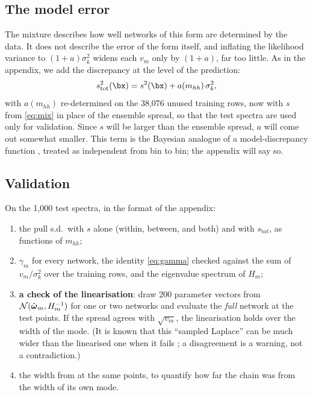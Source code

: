 \subsection{The model error}

The mixture describes how well networks of this form are determined by the data. It does not
describe the error of the form itself, and inflating the likelihood variance to
$(1+a)\sigma_k^2$ widens each $v_m$ only by $(1+a)$, far too little. As in the appendix, we
add the discrepancy at the level of the prediction:
\begin{equation}
  s_\text{tot}^2(\bx) = s^2(\bx) + a(m_{hh})\, \sigma_k^2 ,
\end{equation}
with $a(m_{hh})$ re-determined on the 38,076 unused training rows, now with $s$ from
\cref{eq:mix} in place of the ensemble spread, so that the test spectra are used only for
validation. Since $s$ will be larger than the ensemble spread, $a$ will come out somewhat
smaller. This term is the Bayesian analogue of a model-discrepancy function
\cite{Kennedy:2001}, treated as independent from bin to bin; the appendix will say so.

\subsection{Validation}

On the 1,000 test spectra, in the format of the appendix:
\begin{enumerate}
  \item the pull s.d.\ with $s$ alone (within, between, and both) and with $s_\text{tot}$,
    as functions of $m_{hh}$;
  \item $\gamma_m$ for every network, the identity \cref{eq:gamma} checked against the sum
    of $v_m/\sigma_k^2$ over the training rows, and the eigenvalue spectrum of $H_m$;
  \item \textbf{a check of the linearisation}: draw 200 parameter vectors from
    $\mathcal{N}(\hat{\boldsymbol{\omega}}_m, H_m^{-1})$ for one or two networks and evaluate the \emph{full}
    network at the test points. If the spread agrees with $\sqrt{v_m}$, the linearisation
    holds over the width of the mode. (It is known that this ``sampled Laplace'' can be much
    wider than the linearised one when it fails \cite{Immer:2021}; a disagreement is a
    warning, not a contradiction.)
  \item the width from  at the same points, to quantify how far the
    chain was from the width of its own mode.
\end{enumerate}

